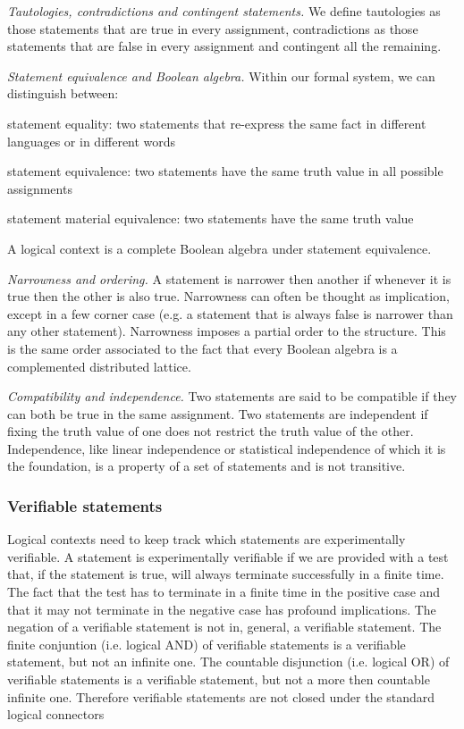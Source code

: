 \documentclass[twocolumn]{article}
\begin{document}
\emph{Tautologies, contradictions and contingent statements.} We define tautologies as those statements that are true in every assignment, contradictions as those statements that are false in every assignment and contingent all the remaining.

\emph{Statement equivalence and Boolean algebra.} Within our formal system, we can distinguish between:
\begin{description}
	\item statement equality: two statements that re-express the same fact in different languages or in different words
	\item statement equivalence: two statements have the same truth value in all possible assignments
	\item statement material equivalence: two statements have the same truth value
\end{description}
A logical context is a complete Boolean algebra under statement equivalence.

\emph{Narrowness and ordering.} A statement is narrower then another if whenever it is true then the other is also true. Narrowness can often be thought as implication, except in a few corner case (e.g. a statement that is always false is narrower than any other statement). Narrowness imposes a partial order to the structure. This is the same order associated to the fact that every Boolean algebra is a complemented distributed lattice.

\emph{Compatibility and independence.} Two statements are said to be compatible if they can both be true in the same assignment. Two statements are independent if fixing the truth value of one does not restrict the truth value of the other. Independence, like linear independence or statistical independence of which it is the foundation, is a property of a set of statements and is not transitive.

\subsubsection{Verifiable statements}

Logical contexts need to keep track which statements are experimentally verifiable. A statement is experimentally verifiable if we are provided with a test that, if the statement is true, will always terminate successfully in a finite time. The fact that the test has to terminate in a finite time in the positive case and that it may not terminate in the negative case has profound implications. The negation of a verifiable statement is not in, general, a verifiable statement. The finite conjuntion (i.e. logical AND) of verifiable statements is a verifiable statement, but not an infinite one. The countable disjunction (i.e. logical OR) of verifiable statements is a verifiable statement, but not a more then countable infinite one. Therefore verifiable statements are not closed under the standard logical connectors
\end{document}

